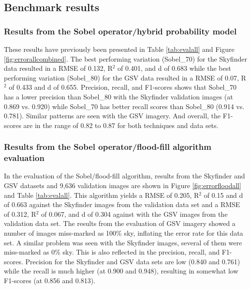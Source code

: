 \documentclass[final,3p,times,authoryear]{elsarticle}
\begin{document}
\subsection{Benchmark results}
\subsubsection{Results from the \cite{Wang2015a} Sobel operator/hybrid probability model}
These results have previously been presented in Table \ref{tab:evalall} and Figure \ref{fig:errorallcombined}. The best performing variation (Sobel\_70) for the Skyfinder data resulted in a RMSE of 0.132, R$^{2}$ of 0.401, and d of 0.683 while the best performing variation (Sobel\_80) for the GSV data resulted in a RMSE of 0.07, R$^{2}$ of 0.433 and d of 0.655. Precision, recall, and F1-scores shows that Sobel\_70 has a lower precision than Sobel\_80 with the Skyfinder validation images (at 0.869 vs. 0.920) while Sobel\_70 has better recall scores than Sobel\_80 (0.914 vs. 0.781). Similar patterns are seen with the GSV imagery. And overall, the F1-scores are in the range of 0.82 to 0.87 for both techniques and data sets.

\subsubsection{Results from the \cite{Middel2018} Sobel operator/flood-fill algorithm evaluation}\label{sec:resultsflood}
In the evaluation of the Sobel/flood-fill algorithm, results from the Skyfinder and GSV datasets and 9,636 validation images are shown in Figure \ref{fig:errorfloodall} and Table \ref{tab:evalall}. This algorithm yields a RMSE of 0.205, R$^{2}$ of 0.15 and d of 0.663 against the Skyfinder images from the validation data set and a RMSE of 0.312, R$^{2}$ of 0.067, and d of 0.304 against with the GSV images from the validation data set. The results from the evaluation of GSV imagery showed a number of images miss-marked as 100\% sky, inflating the error rate for this data set. A similar problem was seen with the Skyfinder images, several of them were miss-marked as 0\% sky. This is also reflected in the precision, recall, and F1-scores. Precision for the Skyfinder and GSV data sets are low (0.840 and 0.761) while the recall is much higher (at 0.900 and 0.948), resulting in somewhat low F1-scores (at 0.856 and 0.813). 
\end{document}
